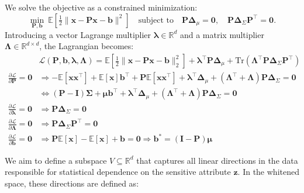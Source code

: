 \documentclass[ecta,nameyear,final]{econsocart}
\numberwithin{equation}{section}
\theoremstyle{plain}
\theoremstyle{definition}
\begin{document}
\begin{appendix}
We solve the objective as a constrained minimization:
$$
\min_{\mathbf{\mathbf{P}}, \mathbf{b}} \ \mathbb{E} \left[ \tfrac{1}{2} \|\mathbf{x} - \mathbf{P}\mathbf{x} - \mathbf{b}\|^2 \right]
\quad \text{subject to} \quad
\mathbf{\mathbf{P}} \boldsymbol{\Delta}_{\mu} = \mathbf{0}, \quad \mathbf{\mathbf{P}} \boldsymbol{\Delta}_{\Sigma} \mathbf{\mathbf{P}}^\top = \mathbf{0}.
$$
Introducing a vector Lagrange multiplier $\boldsymbol{\lambda} \in \mathbb{R}^d$ and a matrix multiplier $\boldsymbol{\Lambda} \in \mathbb{R}^{d \times d}$, the Lagrangian becomes:
\begin{align*}
    &\mathcal{L}(\mathbf{\mathbf{P}}, \mathbf{b}, \boldsymbol{\lambda}, \boldsymbol{\Lambda}) = \mathbb{E}\left[\frac{1}{2}\|\mathbf{x} - \mathbf{P}\mathbf{x} - \mathbf{b}\|^{2}_{2}\right] + \boldsymbol{\lambda}^\top \mathbf{\mathbf{P}} \boldsymbol{\Delta}_{\mu} + \mathrm{Tr}(\boldsymbol{\Lambda}^\top \mathbf{\mathbf{P}} \boldsymbol{\Delta}_{\Sigma} \mathbf{\mathbf{P}}^\top) \\
    \frac{\partial \mathcal{L}}{\partial \mathbf{\mathbf{P}}} = \mathbf{0} &\Rightarrow -\mathbb{E}[\mathbf{x}\mathbf{x}^{\top}] + \mathbb{E}[\mathbf{x}]\mathbf{b}^{\top} + \mathbf{\mathbf{P}}\mathbb{E}[\mathbf{x}\mathbf{x}^{\top}] + \boldsymbol{\lambda}^{\top}\boldsymbol{\Delta}_{\mu} + (\boldsymbol{\Lambda}^{\top}+\boldsymbol{\Lambda})\mathbf{\mathbf{P}}\boldsymbol{\Delta}_{\Sigma} = \mathbf{0} \\
    &\Leftrightarrow (\mathbf{\mathbf{P}}-\mathbf{I})\boldsymbol{\Sigma} + \boldsymbol{\mu} \mathbf{b}^{\top} + \boldsymbol{\lambda}^{\top}\boldsymbol{\Delta}_{\mu} + (\boldsymbol{\Lambda}^{\top}+\boldsymbol{\Lambda})\mathbf{\mathbf{P}}\boldsymbol{\Delta}_{\Sigma} = \mathbf{0} \\
    \frac{\partial \mathcal{L}}{\partial \boldsymbol{\lambda}} = \mathbf{0} &\Rightarrow \mathbf{\mathbf{P}} \boldsymbol{\Delta}_{\Sigma} = \mathbf{0} \\
    \frac{\partial \mathcal{L}}{\partial \boldsymbol{\Lambda}} = \mathbf{0} &\Rightarrow \mathbf{\mathbf{P}}\boldsymbol{\Delta}_{\Sigma}\mathbf{\mathbf{P}}^{\top} = \mathbf{0} \\
    \frac{\partial \mathcal{L}}{\partial \mathbf{b}} = \mathbf{0} &\Rightarrow \mathbf{\mathbf{P}}\mathbb{E}[\mathbf{x}] - \mathbb{E}[\mathbf{x}] + \mathbf{b} = \mathbf{0} \Rightarrow \mathbf{b}^{*} = (\mathbf{I} - \mathbf{\mathbf{P}})\boldsymbol{\mu}
\end{align*}

We aim to define a subspace $V \subseteq \mathbb{R}^d$ that captures all linear directions in the data responsible for statistical dependence on the sensitive attribute $\mathbf{z}$. In the whitened space, these directions are defined as:


\end{appendix}
\end{document}
